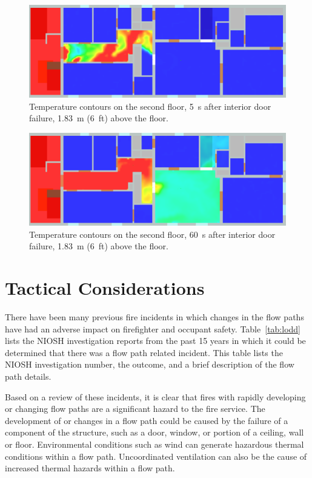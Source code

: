 \documentclass[12pt,oneside]{book}
\begin{document}
\begin{figure}[!ht]
\centering
\includegraphics[width=.68\textwidth]{../Figures/west_50th_baseline_top_165_6ft}
 

\caption[Temperature contours on the second floor, 5~s after interior door failure.]
{Temperature contours on the second floor, 5~s after interior door failure, 1.83~m (6~ft) above the floor.}
\label{fig:temp_top_165}
\end{figure}

\begin{figure}[!ht]
\centering
\includegraphics[width=.68\textwidth]{../Figures/west_50th_baseline_top_220_6ft}
 

\caption[Temperature contours on the second floor, 60~s after interior door failure.]
{Temperature contours on the second floor, 60~s after interior door failure, 1.83~m (6~ft) above the floor.}
\label{fig:temp_top_220}
\end{figure}


\section{Tactical Considerations}
There have been many previous fire incidents in which changes in the flow paths have had an adverse impact on firefighter and occupant safety. Table~\ref{tab:lodd} lists the NIOSH investigation reports from the past 15 years in which it could be determined that there was a flow path related incident. This table lists the NIOSH investigation number, the outcome, and a brief description of the flow path details.

Based on a review of these incidents, it is clear that fires with rapidly developing or changing flow paths are a significant hazard to the fire service. The development of or changes in a flow path could be caused by the failure of a component of the structure, such as a door, window, or portion of a ceiling, wall or floor. Environmental conditions such as wind can generate hazardous thermal conditions within a flow path. Uncoordinated ventilation can also be the cause of increased thermal hazards within a flow path. 
\end{document}
